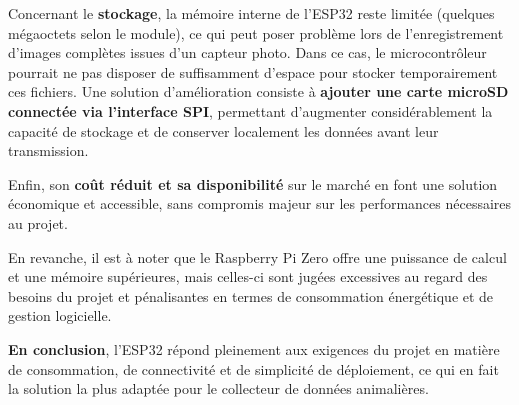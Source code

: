 \documentclass{param}
\begin{document}
Concernant le \textbf{stockage}, la mémoire interne de l’ESP32 reste limitée (quelques mégaoctets selon le module), ce qui peut poser problème lors de l’enregistrement d’images complètes issues d’un capteur photo. Dans ce cas, le microcontrôleur pourrait ne pas disposer de suffisamment d’espace pour stocker temporairement ces fichiers. Une solution d’amélioration consiste à \textbf{ajouter une carte microSD connectée via l’interface SPI}, permettant d’augmenter considérablement la capacité de stockage et de conserver localement les données avant leur transmission.  
\newline

Enfin, son \textbf{coût réduit et sa disponibilité} sur le marché en font une solution économique et accessible, sans compromis majeur sur les performances nécessaires au projet.  
\newline

En revanche, il est à noter que le Raspberry Pi Zero offre une puissance de calcul et une mémoire supérieures, mais celles-ci sont jugées excessives au regard des besoins du projet et pénalisantes en termes de consommation énergétique et de gestion logicielle.  
\newline


\medskip
\noindent
\textbf{En conclusion}, l’ESP32 répond pleinement aux exigences du projet en matière de consommation, de connectivité et de simplicité de déploiement, ce qui en fait la solution la plus adaptée pour le collecteur de données animalières.
\end{document}
